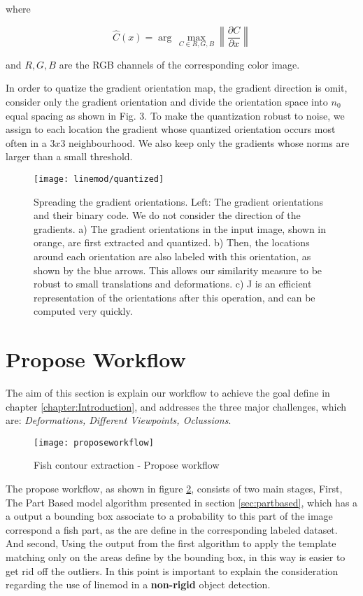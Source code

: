 where

\begin{equation}
\hat{C}(x)=\arg \, \max\limits_{C \in {R,G,B}}\left\|\frac{\partial C}{\partial x}\right\|
\end{equation}

and $R,G,B$ are the RGB channels of the corresponding color image.

In order to quatize the gradient orientation map, the gradient direction is omit,
consider only the gradient orientation and divide the orientation space into $n_0$
equal spacing as shown in Fig. 3. To make the quantization robust to 
noise, we assign to each location the gradient whose quantized orientation occurs most often in a $3 x 3$
neighbourhood. We also keep only the gradients whose norms are larger than a small
threshold.

\begin{figure}[ht]
\centering
\texttt{[image: linemod/quantized]}
\caption{Spreading the gradient orientations. Left: The gradient orientations and their binary code. We do not consider the direction of the gradients. a) The gradient orientations in the input image, shown in orange, are first extracted and quantized. b) Then, the locations around each orientation are also labeled with this orientation, as shown by the blue
arrows. This allows our similarity measure to be robust to small translations and deformations. c) J is an efficient representation of the orientations after this operation, and can be computed very quickly.}
\label{fig:clutter}
\end{figure}

\section{Propose Workflow}
The aim of this section is explain our workflow to achieve the goal define in 
chapter \ref{chapter:Introduction}, and addresses the three major challenges, which are:
\textit{Deformations, Different Viewpoints, Oclussions}.

\begin{figure}[ht]
\begin{adjustwidth}{-1in}{-1in}
\centering
\texttt{[image: proposeworkflow]}
\caption{Fish contour extraction - Propose workflow}
\label{fig:Proposeworkflow}
\end{adjustwidth}
\end{figure}

The propose workflow, as shown in figure \ref{fig:Proposeworkflow}, consists of two
main stages, First, The Part Based model algorithm presented in section \ref{sec:partbased}, which 
has a a output a bounding box associate to a probability to this part of the image correspond a
fish part, as the are define in the corresponding labeled dataset. And second, Using the output
from the first algorithm to apply the template matching only on the areas define by the bounding box,
in this way is easier to get rid off the outliers. In this point is important to explain
the consideration regarding the use of linemod in a \textbf{non-rigid} object detection.


